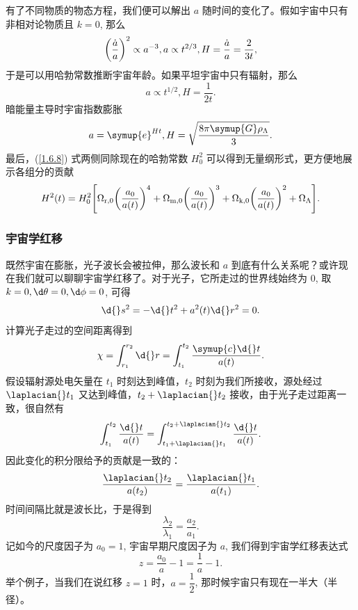 \documentclass[../天体物理基础.tex]{subfiles}
\begin{document}
有了不同物质的物态方程，我们便可以解出 $a$ 随时间的变化了。假如宇宙中只有非相对论物质且 $k=0$, 那么
\begin{equation}
\mleft(\frac{\dot{a}}{a}\mright)^{2}\propto{}a^{-3}, a\propto{}t^{2/3}, H=\frac{\dot{a}}{a}=\frac{2}{3t},
\end{equation}
于是可以用哈勃常数推断宇宙年龄。如果平坦宇宙中只有辐射，那么
\begin{equation}
a\propto{}t^{1/2}, H=\frac{1}{2t}.
\end{equation}
暗能量主导时宇宙指数膨胀
\begin{equation}
a=\symup{e}^{Ht}, H=\sqrt{\frac{8\pi\symup{G}\rho_{\Lambda}}{3}}.
\end{equation}
最后，(\ref{1.6.8}) 式两侧同除现在的哈勃常数 $H_{0}^{2}$ 可以得到无量纲形式，更方便地展示各组分的贡献
\begin{equation}
H^{2}\mleft(t\mright)=H_{0}^{2}\mleft[\Omega_{\mathrm{r}, 0}\mleft(\frac{a_{0}}{a\mleft(t\mright)}\mright)^{4}+\Omega_{\mathrm{m}, 0}\mleft(\frac{a_{0}}{a\mleft(t\mright)}\mright)^{3}+\Omega_{\mathrm{k}, 0}\mleft(\frac{a_{0}}{a\mleft(t\mright)}\mright)^{2}+\Omega_{\Lambda}\mright].
\end{equation}

\subsubsection{宇宙学红移}
既然宇宙在膨胀，光子波长会被拉伸，那么波长和 $a$ 到底有什么关系呢？或许现在我们就可以聊聊宇宙学红移了。对于光子，它所走过的世界线始终为 0, 取 $k=0,\d\theta=0,\d\phi=0$, 可得
\begin{equation}
\d{}s^{2}=-\d{}t^{2}+a^{2}\mleft(t\mright)\d{}r^{2}=0.
\end{equation}
计算光子走过的空间距离得到
\begin{equation}
\chi=\int_{r_{1}}^{r_{2}}\d{}r=\int_{t_{1}}^{t_{2}}\frac{\symup{c}\d{}t}{a\mleft(t\mright)}.
\end{equation}
假设辐射源处电矢量在 $t_{1}$ 时刻达到峰值，$t_{2}$ 时刻为我们所接收，源处经过 $\laplacian{}t_{1}$ 又达到峰值，$t_{2}+\laplacian{}t_{2}$ 接收，由于光子走过距离一致，很自然有
\begin{equation}
\int_{t_{1}}^{t_{2}}\frac{\d{}t}{a\mleft(t\mright)}=\int_{t_{1}+\laplacian{}t_{1}}^{t_{2}+\laplacian{}t_{2}}\frac{\d{}t}{a\mleft(t\mright)}.
\end{equation}
因此变化的积分限给予的贡献是一致的：
\begin{equation}
\frac{\laplacian{}t_{2}}{a\mleft(t_{2}\mright)}=\frac{\laplacian{}t_{1}}{a\mleft(t_{1}\mright)}.
\end{equation}
时间间隔比就是波长比，于是得到
\begin{equation}
\frac{\lambda_{2}}{\lambda_{1}}=\frac{a_{2}}{a_{1}}.
\end{equation}
记如今的尺度因子为 $a_{0}=1$, 宇宙早期尺度因子为 $a$, 我们得到宇宙学红移表达式
\begin{equation}
z=\frac{a_{0}}{a}-1=\frac{1}{a}-1.
\end{equation}
举个例子，当我们在说红移 $z=1$ 时，$a=\dfrac{1}{2}$, 那时候宇宙只有现在一半大（半径）。
\end{document}
